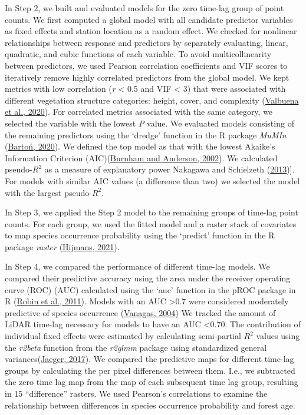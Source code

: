 \documentclass[
]{article}
\begin{document}
In Step 2, we built and evaluated models for the zero time-lag group of point counts. We first computed a global model with all candidate predictor variables as fixed effects and station location as a random effect. We checked for nonlinear relationships between response and predictors by separately evaluating, linear, quadratic, and cubic functions of each variable. To avoid multicollinearity between predictors, we used Pearson correlation coefficients and VIF scores to iteratively remove highly correlated predictors from the global model. We kept metrics with low correlation (\emph{r} \textless{} 0.5 and VIF \textless{} 3) that were associated with different vegetation structure categories: height, cover, and complexity (\protect\hyperlink{ref-valbuenaStandardizingEcosystemMorphological2020}{Valbuena et al., 2020}). For correlated metrics associated with the same category, we selected the variable with the lowest \emph{P} value. We evaluated models consisting of the remaining predictors using the `dredge' function in the R package \emph{MuMIn} (\protect\hyperlink{ref-bartonMuMInMultimodelInference2020}{Bartoń, 2020}). We defined the top model as that with the lowest Akaike's Information Criterion (AIC)(\protect\hyperlink{ref-burnhamModelSelectionMultimodel2002}{Burnham and Anderson, 2002}). We calculated pseudo-\(R^2\) as a measure of explanatory power Nakagawa and Schielzeth (\protect\hyperlink{ref-nakagawaGeneralSimpleMethod2013}{2013}){]}. For models with similar AIC values (a difference than two) we selected the model with the largest pseudo-\(R^2\).

In Step 3, we applied the Step 2 model to the remaining groups of time-lag point counts. For each group, we used the fitted model and a raster stack of covariates to map species occurrence probability using the `predict' function in the R package \emph{raster} (\protect\hyperlink{ref-hijmansRasterGeographicData2021}{Hijmans, 2021}).

In Step 4, we compared the performance of different time-lag models. We compared their predictive accuracy using the area under the receiver operating curve (ROC) (AUC) calculated using the `auc' function in the pROC package in R (\protect\hyperlink{ref-robinPROCOpensourcePackage2011}{Robin et al., 2011}). Models with an AUC \textgreater0.7 were considered moderately predictive of species occurrence (\protect\hyperlink{ref-vanagasReceiverOperatingCharacteristic2004}{Vanagas, 2004}) We tracked the amount of LiDAR time-lag necessary for models to have an AUC \textless0.70. The contribution of individual fixed effects were estimated by calculating semi-partial \(R^2\) values using the \emph{r2beta} function from the \emph{r2glmm} package using standardized general variances(\protect\hyperlink{ref-jaegerR2glmmComputesSquared2017}{Jaeger, 2017}). We compared the predictive maps for different time-lag groups by calculating the per pixel differences between them. I.e., we subtracted the zero time lag map from the map of each subsequent time lag group, resulting in 15 ``difference'' rasters. We used Pearson's correlations to examine the relationship between differences in species occurrence probability and forest age.
\end{document}
